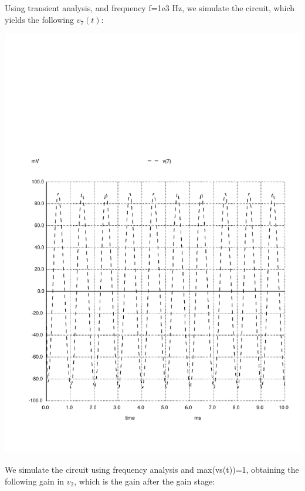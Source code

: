 Using transient analysis, and frequency f=1e3 Hz, we simulate the circuit, which yields the following $v_7(t)$:

\includegraphics[width=1\linewidth]{../sim/vo1.pdf}

We simulate the circuit using frequency analysis and max(vs(t))=1, obtaining the following gain in $v_2$, which is the gain after the gain stage:

